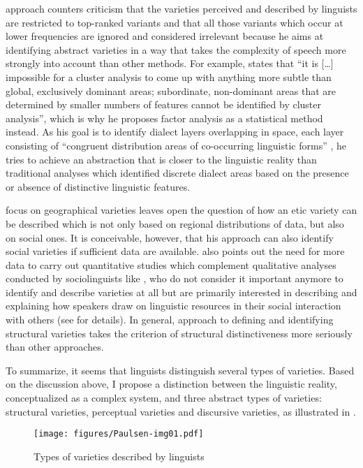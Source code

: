  approach counters  criticism that the varieties perceived and described by linguists are restricted to top-ranked variants and that all those variants which occur at lower frequencies are ignored and considered irrelevant because he aims at identifying abstract varieties in a way that takes the complexity of speech more strongly into account than other methods. For example, \citet[81]{Pickl2016} states that “it is […] impossible for a cluster analysis to come up with anything more subtle than global, exclusively dominant areas; subordinate, non-dominant areas that are determined by smaller numbers of features cannot be identified by cluster analysis”, which is why he proposes factor analysis as a statistical method instead. As his goal is to identify dialect layers overlapping in space, each layer consisting of “congruent distribution areas of co-occurring linguistic forms” \citep[79]{Pickl2016}, he tries to achieve an abstraction that is closer to the linguistic reality than traditional analyses which identified discrete dialect areas based on the presence or absence of distinctive linguistic features.

 focus on geographical varieties leaves open the question of how an etic variety can be described which is not only based on regional distributions of data, but also on social ones. It is conceivable, however, that his approach can also identify social varieties if sufficient data are available. \citet[6]{Leimgruber2013b} also points out the need for more data to carry out quantitative studies which complement qualitative analyses conducted by sociolinguists like \citet{Blommaert2010}, who do not consider it important anymore to identify and describe varieties at all but are primarily interested in describing and explaining how speakers draw on linguistic resources in their social interaction with others (see  for details). In general,  approach to defining and identifying structural varieties takes the criterion of structural distinctiveness more seriously than other approaches.

To summarize, it seems that linguists distinguish several types of varieties. Based on the discussion above, I propose a distinction between the linguistic reality, conceptualized as a complex system, and three abstract types of varieties: structural varieties, perceptual varieties and discursive varieties, as illustrated in .


\begin{figure}
\texttt{[image: figures/Paulsen-img01.pdf]}
\caption{Types of varieties described by linguists}
\label{fig:2:1}
\end{figure}


